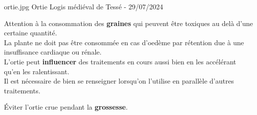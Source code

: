 {\begin{multicols}{2}
\end{multicols}

}
{%
    ortie.jpg
}
{%
    Ortie
}
{%
    Logis médiéval de Tessé - 29/07/2024 
}
\begin{Remarque}

    \bcattention Attention à la consommation des \textbf{graines} qui peuvent être toxiques au delà d'une certaine quantité.\\

    \bcattention La plante ne doit pas être consommée en cas d'oedème par rétention due à une insuffisance cardiaque ou rénale.\\

    \bcattention L'ortie peut \textbf{influencer} des traitements en cours aussi bien en les accélérant qu'en les ralentissant.\\
    Il est nécessaire de bien se renseigner lorsqu'on l'utilise en parallèle d'autres traitements.

    \bcattention \'Eviter l'ortie crue pendant la \textbf{grossesse}.
\end{Remarque}
\renewcommand{\cita}{}